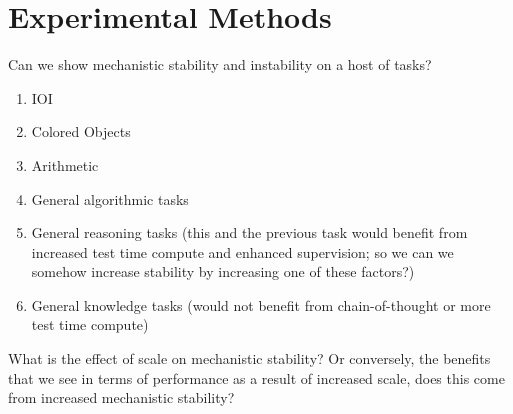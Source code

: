 \documentclass[10pt]{article}
\begin{document}
\section{Experimental Methods}
Can we show mechanistic stability and instability on a host of tasks?
\begin{enumerate}
\item IOI
\item Colored Objects
\item Arithmetic
\item General algorithmic tasks
\item General reasoning tasks (this and the previous task would benefit
from increased test time compute and enhanced supervision; so we can we
somehow increase stability by increasing one of these factors?)
\item General knowledge tasks (would not benefit from chain-of-thought or more
test time compute)
\end{enumerate}
What is the effect of scale on mechanistic stability? Or conversely, the benefits
that we see in terms of performance as a result of increased scale, does this
come from increased mechanistic stability?



\end{document}

